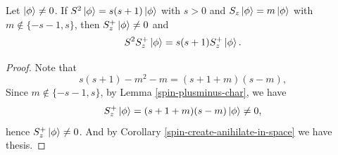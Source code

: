 \documentclass[main.tex]{subfiles}
\begin{document}
\begin{corollary}
\label{spin-push-forward}
Let $\ket{\phi}\not = 0$.
If $S^2\ket{\phi} = s(s + 1)\ket{\phi}$ with $s > 0$ and $S_z\ket{\phi} = m\ket{\phi}$
with $m \not\in \{-s - 1, s\}$, then $S_z^{+}\ket{\phi} \not= 0$ and
\begin{equation}
S^2 S_z^{+}\ket{\phi} = s(s + 1) S_z^{+}\ket{\phi}.
\end{equation}
\end{corollary}
\begin{proof}
Note that
\begin{equation}
s(s+1) - m^2 - m = (s + 1 + m)(s - m),
\end{equation} 
Since $m \not\in \{-s - 1, s\}$, by Lemma \ref{spin-plusminus-char}, we have $$S_z^{+}\ket{\phi} = (s + 1 + m)(s - m)\ket{\phi} \not= 0,$$ hence 
$S_z^{+}\ket{\phi} \not= 0$.  And by Corollary \ref{spin-create-anihilate-in-space} we have thesis.
\end{proof}
\end{document}
